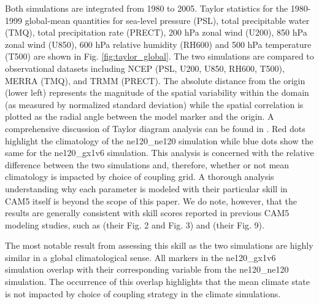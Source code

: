 \documentclass[draft,ms]{AGUTeX}
\begin{document}
\begin{article}
Both simulations are integrated from 1980 to 2005. Taylor statistics for the 1980-1999 global-mean quantities for sea-level pressure (PSL), total precipitable water (TMQ), total precipitation rate (PRECT), 200 hPa zonal wind (U200), 850 hPa zonal wind (U850), 600 hPa relative humidity (RH600) and 500 hPa temperature (T500) are shown in Fig. \ref{fig:taylor_global}. The two simulations are compared to observational datasets including NCEP \citep{Kalnay1996} (PSL, U200, U850, RH600, T500), MERRA \citep{Rienecker2011} (TMQ), and TRMM \citep{TRMM3B43} (PRECT). The absolute distance from the origin (lower left) represents the magnitude of the spatial variability within the domain (as measured by normalized standard deviation) while the spatial correlation is plotted as the radial angle between the model marker and the origin. A comprehensive discussion of Taylor diagram analysis can be found in \citet{Taylor2001}. Red dots highlight the climatology of the ne120\_ne120 simulation while blue dots show the same for the ne120\_gx1v6 simulation. This analysis is  concerned with the relative difference between the two simulations and, therefore, whether or not mean climatology is impacted by choice of coupling grid. A thorough analysis understanding why each parameter is modeled with their particular skill in CAM5 itself is beyond the scope of this paper. We do note, however, that the results are generally consistent with skill scores reported in previous CAM5 modeling studies, such as \citet{Bacmeister2014} (their Fig. 2 and Fig. 3) and \citet{Zarzycki2015AMIP} (their Fig. 9).

The most notable result from assessing this skill as the two simulations are highly similar in a global climatological sense. All markers in the ne120\_gx1v6 simulation overlap with their corresponding variable from the ne120\_ne120 simulation. The occurrence of this overlap highlights that the mean climate state is not impacted by choice of coupling strategy in the climate simulations.



\end{article}
\end{document}
